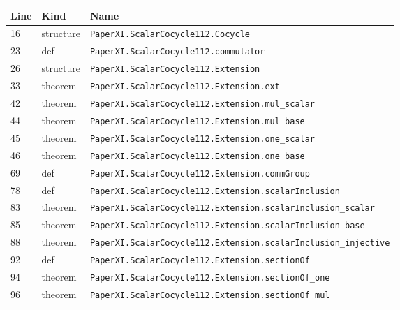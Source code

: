 \documentclass[10pt,oneside]{book}
\begin{document}
\begin{longtable}{@{}p{}p{}p{}@{}}\toprule Line&Kind&Name\\\midrule\endhead

16&structure&\nolinkurl{PaperXI.ScalarCocycle112.Cocycle}\\

23&def&\nolinkurl{PaperXI.ScalarCocycle112.commutator}\\

26&structure&\nolinkurl{PaperXI.ScalarCocycle112.Extension}\\

33&theorem&\nolinkurl{PaperXI.ScalarCocycle112.Extension.ext}\\

42&theorem&\nolinkurl{PaperXI.ScalarCocycle112.Extension.mul_scalar}\\

44&theorem&\nolinkurl{PaperXI.ScalarCocycle112.Extension.mul_base}\\

45&theorem&\nolinkurl{PaperXI.ScalarCocycle112.Extension.one_scalar}\\

46&theorem&\nolinkurl{PaperXI.ScalarCocycle112.Extension.one_base}\\

69&def&\nolinkurl{PaperXI.ScalarCocycle112.Extension.commGroup}\\

78&def&\nolinkurl{PaperXI.ScalarCocycle112.Extension.scalarInclusion}\\

83&theorem&\nolinkurl{PaperXI.ScalarCocycle112.Extension.scalarInclusion_scalar}\\

85&theorem&\nolinkurl{PaperXI.ScalarCocycle112.Extension.scalarInclusion_base}\\

88&theorem&\nolinkurl{PaperXI.ScalarCocycle112.Extension.scalarInclusion_injective}\\

92&def&\nolinkurl{PaperXI.ScalarCocycle112.Extension.sectionOf}\\

94&theorem&\nolinkurl{PaperXI.ScalarCocycle112.Extension.sectionOf_one}\\

96&theorem&\nolinkurl{PaperXI.ScalarCocycle112.Extension.sectionOf_mul}\\


\end{longtable}
\end{document}
